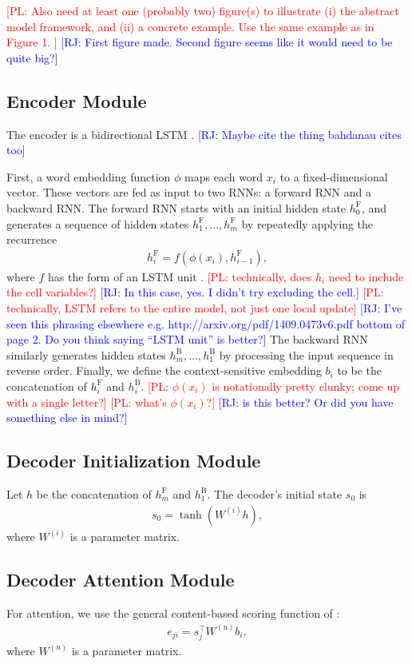 \documentclass[11pt,letterpaper]{article}
\newcommand{\phiin}{\phi}
\newcommand\pl[1]{\textcolor{red}{[PL: #1]}}
\newcommand\rj[1]{\textcolor{blue}{[RJ: #1]}}
\begin{document}
\pl{
  Also need at least one (probably two) figure(s)
  to illustrate (i) the abstract model framework,
  and (ii) a concrete example.  Use the same example as in Figure 1.
}
\rj{First figure made.  Second figure seems like it would need to be quite big?}


\subsection{Encoder Module}
The encoder is a bidirectional LSTM \cite{bahdanau2014neural}.
\rj{Maybe cite the thing bahdanau cites too}

First, a word embedding function $\phiin$ 
maps each word $x_i$ to a fixed-dimensional vector.
These vectors are fed as input to two RNNs: a forward RNN and a backward RNN.
The forward RNN starts with an initial hidden state $h_0^{\text{F}}$,
and generates a sequence of hidden states $h_1^{\text{F}}, \dotsc, h_m^{\text{F}}$ by
repeatedly applying the recurrence 
\begin{align}
  h_i^{\text{F}} = f(\phiin(x_i), h_{i-1}^{\text{F}}),
\end{align}
where $f$ has the form of an LSTM unit \cite{hochreiter1997lstm}.
\pl{technically, does $h_i$ need to include the cell variables?}
\rj{In this case, yes. I didn't try excluding the cell.}
\pl{technically, LSTM refers to the entire model, not just one local update}
\rj{I've seen this phrasing elsewhere
e.g. http://arxiv.org/pdf/1409.0473v6.pdf bottom of page 2.
Do you think saying ``LSTM unit'' is better?}
The backward RNN similarly generates hidden states $h_m^{\text{B}}, \dotsc, h_1^{\text{B}}$
by processing the input sequence in reverse order.
Finally, we define 
the context-sensitive embedding
$b_i$ to be the concatenation of $h_i^{\text{F}}$ and $h_i^{\text{B}}$.
\pl{$\phiin(x_i)$ is notationally pretty clunky; come up with a single letter?}
\pl{what's $\phi(x_i)$?}
\rj{is this better?  Or did you have something else in mind?}

\subsection{Decoder Initialization Module}
Let $h$ be the concatenation of $h_m^{\text{F}}$ and $h_1^{\text{B}}$.
The decoder's initial state $s_0$ is
\begin{align}
  s_0 = \tanh(W^{(i)} h),
\end{align}
where $W^{(i)}$ is a parameter matrix.

\subsection{Decoder Attention Module}
For attention, we use the general content-based scoring function of
:
\begin{align}
  e_{ji} = s_j^\top W^{(u)} b_i,
\end{align}
where $W^{(u)}$ is a parameter matrix.
\end{document}
